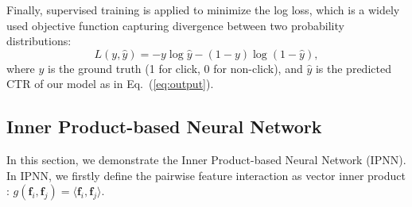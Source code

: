 \documentclass[conference]{IEEEtran}
\newcommand{\bs}{\boldsymbol}
\newcommand{\bz}{\bs{z}}
\newcommand{\bp}{\bs{p}}
\newcommand{\Bf}{\bs{f}}
\newcommand{\weinan}[1]{{\bf \color{red} [[Weinan says ``#1'']]}}
\newcommand{\kan}[1]{{\bf \color{green} [[Kan says ``#1'']]}}
\begin{document}
Finally, supervised training is applied to minimize the log loss, which is a widely used objective function capturing divergence between two probability distributions: %
\begin{equation}\label{log_loss}
L(y,\hat{y}) = -y \log\hat{y} - (1-y) \log(1-\hat{y}),
\end{equation}
where $y$ is the ground truth (1 for click, 0 for non-click), and $\hat{y}$ is the predicted CTR of our model as in Eq.~(\ref{eq:output}).

\subsection{Inner Product-based Neural Network}\label{sec:pnn-i}
In this section, we demonstrate the Inner Product-based Neural Network (IPNN). In IPNN, we firstly define the pairwise feature interaction as vector inner product
: $g(\Bf_i, \Bf_j) = \langle \Bf_i,\Bf_j \rangle$.

\end{document}
